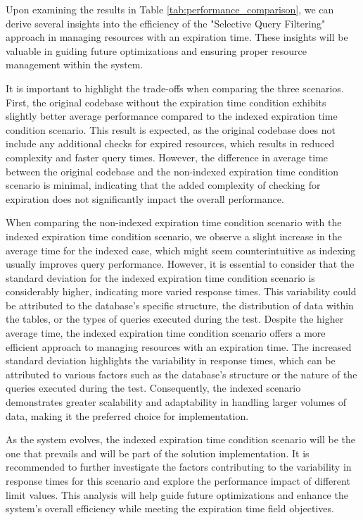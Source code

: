 \documentclass[a4paper,fleqn]{cas-dc}
\begin{document}
Upon examining the results in Table \ref{tab:performance_comparison}, we can derive several insights into the efficiency of the "Selective Query Filtering" approach in managing resources with an expiration time. These insights will be valuable in guiding future optimizations and ensuring proper resource management within the system.

It is important to highlight the trade-offs when comparing the three scenarios. First, the original codebase without the expiration time condition exhibits slightly better average performance compared to the indexed expiration time condition scenario. This result is expected, as the original codebase does not include any additional checks for expired resources, which results in reduced complexity and faster query times. However, the difference in average time between the original codebase and the non-indexed expiration time condition scenario is minimal, indicating that the added complexity of checking for expiration does not significantly impact the overall performance.

When comparing the non-indexed expiration time condition scenario with the indexed expiration time condition scenario, we observe a slight increase in the average time for the indexed case, which might seem counterintuitive as indexing usually improves query performance. However, it is essential to consider that the standard deviation for the indexed expiration time condition scenario is considerably higher, indicating more varied response times. This variability could be attributed to the database's specific structure, the distribution of data within the tables, or the types of queries executed during the test. Despite the higher average time, the indexed expiration time condition scenario offers a more efficient approach to managing resources with an expiration time. The increased standard deviation highlights the variability in response times, which can be attributed to various factors such as the database's structure or the nature of the queries executed during the test. Consequently, the indexed scenario demonstrates greater scalability and adaptability in handling larger volumes of data, making it the preferred choice for implementation.

As the system evolves, the indexed expiration time condition scenario will be the one that prevails and will be part of the solution implementation. It is recommended to further investigate the factors contributing to the variability in response times for this scenario and explore the performance impact of different limit values. This analysis will help guide future optimizations and enhance the system's overall efficiency while meeting the expiration time field objectives.
\end{document}
